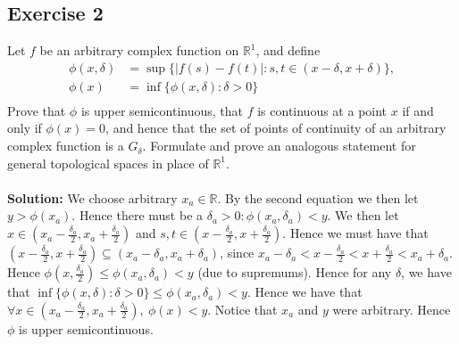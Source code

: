 \documentclass{article}
\begin{document}
\subsection*{Exercise 2}
Let $f$ be an arbitrary complex function on $\mathbb{R}^1$, and define
\begin{equation*}
    \begin{aligned}
        \phi(x, \delta) &= \sup \{ |f(s)-f(t)|:s,t \in (x-\delta, x+\delta) \}, \\
        \phi(x) &= \inf \{ \phi(x, \delta): \delta > 0 \} \\
    \end{aligned}
\end{equation*}
Prove that $\phi$ is upper semicontinuous, that $f$ is continuous at a point $x$ if and only if
$\phi(x)=0$, and hence that the set of points of continuity of an arbitrary complex function
is a $G_\delta$. Formulate and prove an analogous statement for general topological spaces
in place of $\mathbb{R}^1$.
\\\\
\textbf{Solution:}
We choose arbitrary $x_a \in \mathbb{R}$. By the second equation we then let $y > \phi(x_a)$.
Hence there must be a $\delta_a >0: \phi(x_a, \delta_a)<y$.
We then let $x \in (x_a-\frac{\delta_a}{2}, x_a+\frac{\delta_a}{2})$ and $s,t \in (x-\frac{\delta_a}{2}, x+ \frac{\delta_a}{2})$.
Hence we must have that $(x-\frac{\delta_a}{2}, x+\frac{\delta_a}{2}) \subseteq (x_a-\delta_a,x_a+\delta_a)$, since
$x_a - \delta_a < x-\frac{\delta_a}{2} < x+\frac{\delta_a}{2} < x_a+\delta_a$.
Hence $\phi(x, \frac{\delta_a}{2}) \le \phi(x_a, \delta_a) < y$ (due to supremums).
Hence for any $\delta$, we have that $\inf\{\phi(x,\delta):\delta>0\} \le \phi(x_a, \delta_a) < y$.
Hence we have that $\forall x \in (x_a-\frac{\delta_a}{2}, x_a+\frac{\delta_a}{2}), \ \phi(x) < y$.
Notice that $x_a$ and $y$ were arbitrary.
Hence $\phi$ is upper semicontinuous.
\\\\
\end{document}
